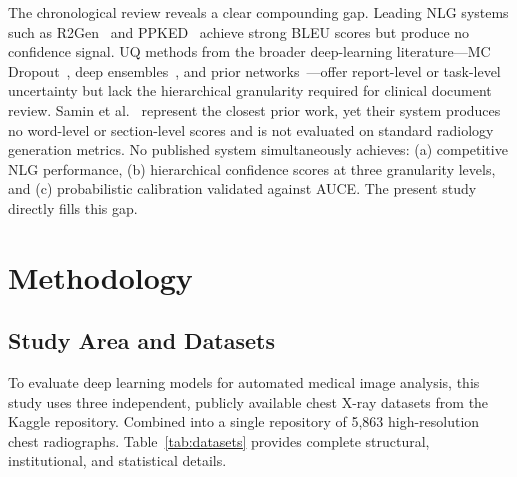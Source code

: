 \documentclass{jcst}
\begin{document}
The chronological review reveals a clear compounding gap. Leading NLG systems such as
R2Gen~\cite{chen2020} and PPKED~\cite{yang2021} achieve strong BLEU scores but produce
no confidence signal. UQ methods from the broader deep-learning literature---MC
Dropout~\cite{gal2016}, deep ensembles~\cite{lakshminarayanan2017}, and prior
networks~\cite{malinin2018}---offer report-level or task-level uncertainty but lack the
hierarchical granularity required for clinical document review. Samin et al.~\cite{samin2024}
represent the closest prior work, yet their system produces no word-level or section-level scores
and is not evaluated on standard radiology generation metrics. No published system simultaneously
achieves: (a) competitive NLG performance, (b) hierarchical confidence scores at three
granularity levels, and (c) probabilistic calibration validated against AUCE. The present study
directly fills this gap.

\section{Methodology}
\label{sec:methodology}

\subsection{Study Area and Datasets}

To evaluate deep learning models for automated medical image analysis, this study uses three
independent, publicly available chest X-ray datasets from the Kaggle repository. Combined into a single
repository of 5,863 high-resolution chest radiographs. Table~\ref{tab:datasets} provides complete
structural, institutional, and statistical details.
\end{document}
